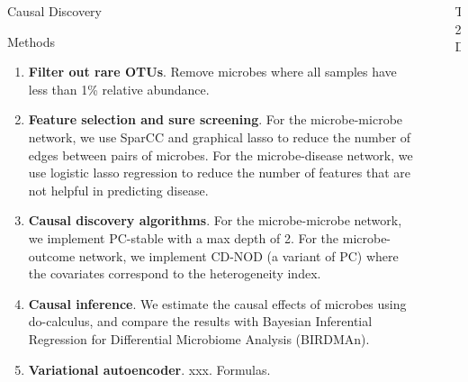 \documentclass[final]{beamer}
\newlength{\sepwidth}
\newlength{\colwidth}
\newcommand{\separatorcolumn}{\begin{column}{\sepwidth}\end{column}}
\begin{document}
\begin{frame}[t]
\begin{columns}[t]
\begin{column}{\colwidth}
\begin{alertblock}{Causal Discovery}
	  \end{alertblock}
	  
\begin{block}{Methods}


    \begin{enumerate}
      \item \textbf{Filter out rare OTUs}. Remove microbes where all samples have less than 1\%
      relative abundance. 
      \item \textbf{Feature selection and sure screening}. For the microbe-microbe network, we use SparCC and graphical lasso to reduce the number of edges between pairs of microbes.
      For the microbe-disease network, we use logistic lasso regression to reduce the number of features that are not helpful in predicting disease. 
      \item \textbf{Causal discovery algorithms}. For the microbe-microbe network, we implement PC-stable with a max depth of 2. For the microbe-outcome network, we implement CD-NOD (a variant of PC) where the covariates correspond to the heterogeneity index. 
      \item \textbf{Causal inference}. We estimate the causal effects of microbes using do-calculus, and compare the results with Bayesian Inferential Regression for Differential Microbiome Analysis (BIRDMAn).
      \item \textbf{Variational autoencoder}. xxx. Formulas.
    \end{enumerate}

  \end{block}


\end{column}

\separatorcolumn

\begin{column}{\colwidth}

  
  \begin{block}{T2D}



\end{block}
\end{column}
\end{columns}
\end{frame}
\end{document}
